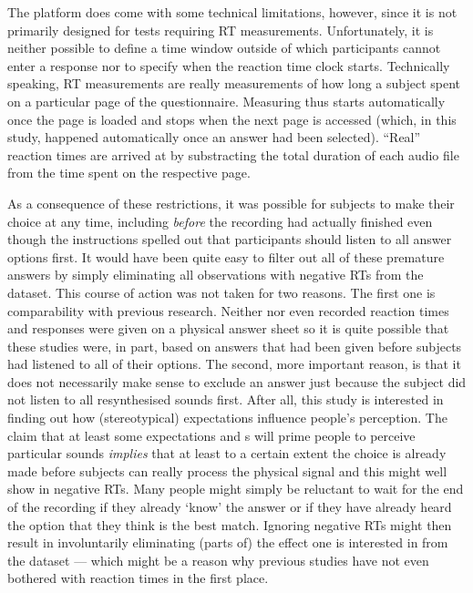 The platform  does come with some technical limitations, however, since it is not primarily designed for tests requiring RT measurements.
Unfortunately, it is neither possible to define a time window outside of which participants cannot enter a response nor to specify when the reaction time clock starts.
Technically speaking, RT measurements are really measurements of how long a subject spent on a particular page of the questionnaire.
Measuring thus starts automatically once the page is loaded and stops when the next page is accessed (which, in this study, happened automatically once an answer had been selected).
``Real'' reaction times are arrived at by substracting the total duration of each audio file from the time spent on the respective page.

As a consequence of these restrictions, it was possible for subjects to make their choice at any time, including \emph{before} the recording had actually finished even though the instructions spelled out that participants should listen to all answer options first.
It would have been quite easy to filter out all of these premature answers by simply eliminating all observations with negative RTs from the dataset.
This course of action was not taken for two reasons.
The first one is comparability with previous research.
Neither \textcite{niedzielski1999} nor \textcite{hayetal2006b,haydrager2010} even recorded reaction times and responses were given on a physical answer sheet so it is quite possible that these studies were, in part, based on answers that had been given before subjects had listened to all of their options.
The second, more important reason, is that it does not necessarily make sense to exclude an answer just because the subject did not listen to all resynthesised sounds first.
After all, this study is interested in finding out how (stereotypical) expectations influence people's perception.
The claim that at least some expectations and s will prime people to perceive particular sounds \emph{implies} that at least to a certain extent the choice is already made before subjects can really process the physical signal and this might well show in negative RTs.
Many people might simply be reluctant to wait for the end of the recording if they already `know' the answer or if they have already heard the option that they think is the best match.
Ignoring negative RTs might then result in involuntarily eliminating (parts of) the  effect one is interested in from the dataset --- which might be a reason why previous studies have not even bothered with reaction times in the first place.


